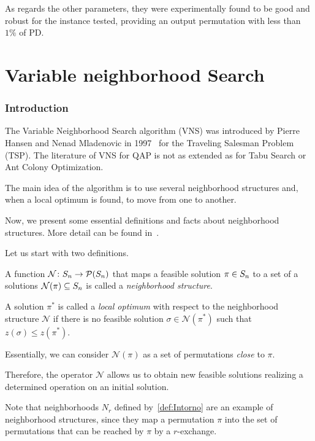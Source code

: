 As regards the other parameters, they were experimentally found  to be good and robust for the instance tested, providing an output permutation with less than $1\%$ of PD. 



\newpage

\section{Variable neighborhood Search}
\label{sec:Variable_neighborhood_Search}

\subsubsection{Introduction}


\noindent The Variable Neighborhood Search algorithm (VNS) was introduced by Pierre Hansen and Nenad Mladenovic in 1997~\cite{Mladenovic1997} for the Traveling Salesman Problem (TSP). The literature of VNS for QAP is not as extended as for Tabu Search or Ant Colony Optimization. 

The main idea of the algorithm is to use several neighborhood structures and, when a local optimum is found, to move from one to another.

Now, we present some essential definitions and facts about neighborhood structures. More detail can be found in~\cite[Ch. 3]{Gendreau2019}.

Let us start with two definitions.

\begin{defi}
	A function $\mathcal N \colon S_n \to \mathcal P(S_n)$ that maps  a feasible solution $\pi \in S_n$ to a set of a solutions $\mathcal N(\pi) \subseteq S_n$ is called a \textit{neighborhood  structure}.
\end{defi}

\begin{defi}
	A solution $\pi^*$ is called a \textit{local optimum} with respect to the neighborhood structure $\mathcal N$ if there is no feasible solution $\sigma \in \mathcal N(\pi^*)$ such that $z(\sigma) \le z(\pi^*)$.
\end{defi}
Essentially, we can consider  $\mathcal N(\pi)$ as a set of permutations \textit{close} to $\pi$.

Therefore, the operator $\mathcal N$ allows us to obtain new feasible solutions realizing a determined operation on an initial solution.

Note that neighborhoods $N_r$ defined by~\eqref{def:Intorno} are an example of neighborhood structures, since they map a permutation $\pi$ into the set of permutations that can be reached by $\pi$ by a $r$-exchange.

